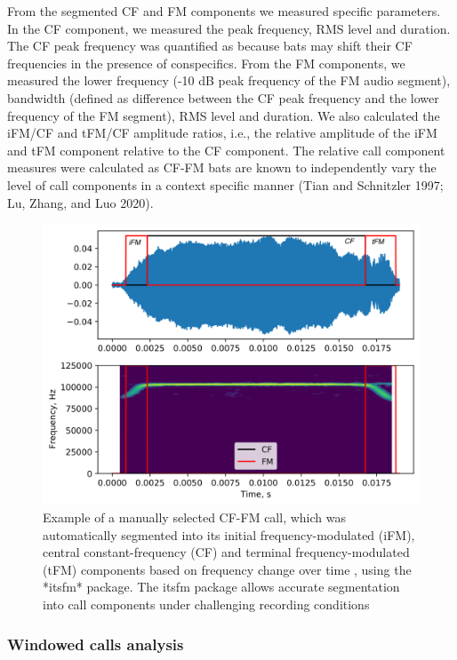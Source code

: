 \documentclass[
]{book}
\begin{document}
From the segmented CF and FM components we measured specific parameters. In the CF component, we measured the peak frequency, RMS level and duration. The CF peak frequency was quantified as because bats may shift their CF frequencies in the presence of conspecifics. From the FM components, we measured the lower frequency (-10 dB peak frequency of the FM audio segment), bandwidth (defined as difference between the CF peak frequency and the lower frequency of the FM segment), RMS level and duration. We also calculated the iFM/CF and tFM/CF amplitude ratios, i.e., the relative amplitude of the iFM and tFM component relative to the CF component. The relative call component measures were calculated as CF-FM bats are known to independently vary the level of call components in a context specific manner (Tian and Schnitzler 1997; Lu, Zhang, and Luo 2020).

\begin{figure}
\includegraphics[width=1\linewidth]{original_papers/hbc-paper/figures/fig1_labelled_original_from_20180816_21502300_30} \caption{Example of a manually selected CF-FM call, which was automatically segmented into its initial frequency-modulated (iFM), central constant-frequency (CF) and terminal frequency-modulated (tFM) components based on frequency change over time , using the *itsfm* package. The itsfm package allows accurate segmentation into call components  under challenging recording conditions}\label{fig:itsFMdemo}
\end{figure}

\hypertarget{windowed-calls-analysis}{%
\subsubsection{Windowed calls analysis}\label{windowed-calls-analysis}}
\end{document}
